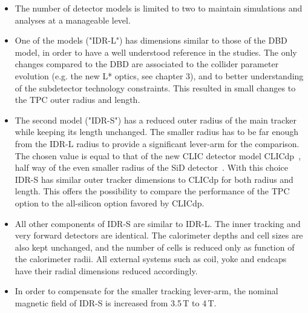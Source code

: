 \begin{itemize}
    
\item The number of detector models is limited to two to maintain simulations and analyses at a manageable level.

\item One of the models ("IDR-L") has dimensions similar to those of the DBD model, in order to have a well understood reference in the studies. The only changes compared to the DBD are associated to the collider parameter evolution (e.g. the new L* optics, see chapter 3), and to better understanding of the subdetector technology constraints. This resulted in small changes to the TPC outer radius and length. 

\item The second model ("IDR-S") has a reduced outer radius of the main tracker while keeping its length unchanged. The smaller radius has to be far enough from the IDR-L radius to provide a significant lever-arm for the comparison. The chosen value is equal to that of the new CLIC detector model CLICdp~\cite{Arominski:2018uuz}, half way of the even smaller radius of the SiD detector~\cite{ild:bib:ilddbd}. With this choice IDR-S has similar outer tracker dimensions to CLICdp for both radius and length. This offers the possibility to compare the performance of the TPC option to the all-silicon option favored by CLICdp. 

\item All other components of IDR-S are similar to IDR-L. The inner tracking and very forward detectors are identical. The calorimeter depths and cell sizes are also kept unchanged, and the number of cells is reduced only as function of the calorimeter radii. All external systems such as coil, yoke and endcaps have their radial dimensions reduced accordingly.

\item In order to compensate for the smaller tracking lever-arm, the nominal magnetic field of IDR-S is increased from 3.5\,T to 4\,T.

\end{itemize}

